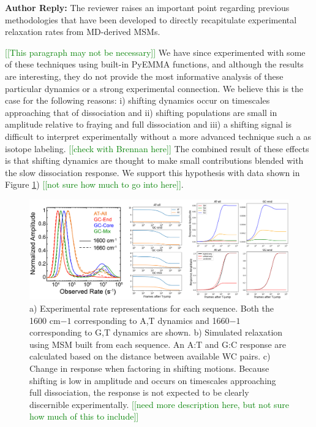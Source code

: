 \documentclass[11pt,a4paper]{letter} %
\newcommand*{\noteg}[1]{\textcolor{green}{[[#1]]}}		%
\begin{document}
\textbf{Author Reply:}   The reviewer raises an important point regarding previous methodologies that have been developed to directly recapitulate experimental relaxation rates from MD-derived MSMs.

\noteg{This paragraph may not be necessary}
We have since experimented with some of these techniques using built-in PyEMMA functions, and although the results are interesting, they do not provide the most informative analysis of these particular dynamics or a strong experimental connection. We believe this is the case for the following reasons: i) shifting dynamics occur on timescales approaching that of dissociation and ii) shifting populations are small in amplitude relative to fraying and full dissociation and iii) a shifting signal is difficult to interpret experimentally without a more advanced technique such a as isotope labeling. \noteg{check with Brennan here} The combined result of these effects is that shifting dynamics are thought to make small contributions blended with the slow dissociation response. We support this hypothesis with data shown in Figure \ref{fig:responses_all}) \noteg{not sure how much to go into here}.

\begin{figure}[ht!]
	\begin{center}
        \includegraphics[width=150mm]{cover_letter/revision_figures/responses_all.png}
        \caption{a) Experimental rate representations for each sequence. Both the 1600 cm$-1$ corresponding to A,T dynamics and 1660$-1$ corresponding to G,T dynamics are shown. b) Simulated relaxation using MSM built from each sequence. An A:T and G:C response are calculated based on the distance between available WC pairs. c) Change in response when factoring in shifting motions. Because shifting is low in amplitude and occurs on timescales approaching full dissociation, the response is not expected to be clearly discernible experimentally.  \noteg{need more description here, but not sure how much of this to include} }
        \label{fig:responses_all}
	\end{center}
\end{figure}
\end{document}
